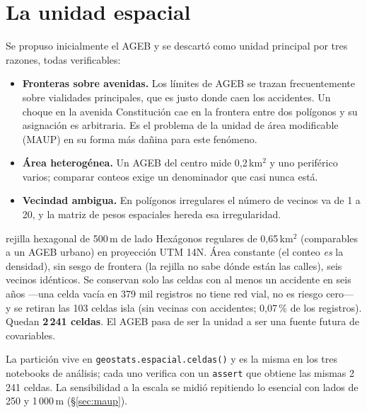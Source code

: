 \documentclass[11pt,a4paper]{article}
\begin{document}
\section{La unidad espacial}

Se propuso inicialmente el AGEB y se descartó como unidad principal por tres
razones, todas verificables:

\begin{itemize}[leftmargin=1.4em]
\item \textbf{Fronteras sobre avenidas.} Los límites de AGEB se trazan
  frecuentemente sobre vialidades principales, que es justo donde caen los
  accidentes. Un choque en la avenida Constitución cae en la frontera entre
  dos polígonos y su asignación es arbitraria. Es el problema de la unidad de
  área modificable (MAUP) en su forma más dañina para este fenómeno.
\item \textbf{Área heterogénea.} Un AGEB del centro mide 0,2\,km$^2$ y uno
  periférico varios; comparar conteos exige un denominador que casi nunca
  está.
\item \textbf{Vecindad ambigua.} En polígonos irregulares el número de vecinos
  va de 1 a 20, y la matriz de pesos espaciales hereda esa irregularidad.
\end{itemize}

\begin{decision}{rejilla hexagonal de 500\,m de lado}
Hexágonos regulares de 0,65\,km$^2$ (comparables a un AGEB urbano) en
proyección UTM 14N. Área constante (el conteo \emph{es} la densidad), sin sesgo
de frontera (la rejilla no sabe dónde están las calles), seis vecinos
idénticos. Se conservan solo las celdas con al menos un accidente en seis
años —una celda vacía en 379 mil registros no tiene red vial, no es riesgo
cero— y se retiran las 103 celdas isla (sin vecinas con accidentes; 0,07\,\% de
los registros). Quedan \textbf{2\,241 celdas}. El AGEB pasa de ser la unidad a
ser una fuente futura de covariables.
\end{decision}

La partición vive en \texttt{geostats.espacial.celdas()} y es la misma en los
tres notebooks de análisis; cada uno verifica con un \texttt{assert} que
obtiene las mismas 2\,241 celdas. La sensibilidad a la escala se midió
repitiendo lo esencial con lados de 250 y 1\,000\,m (§\ref{sec:maup}).

\end{document}
